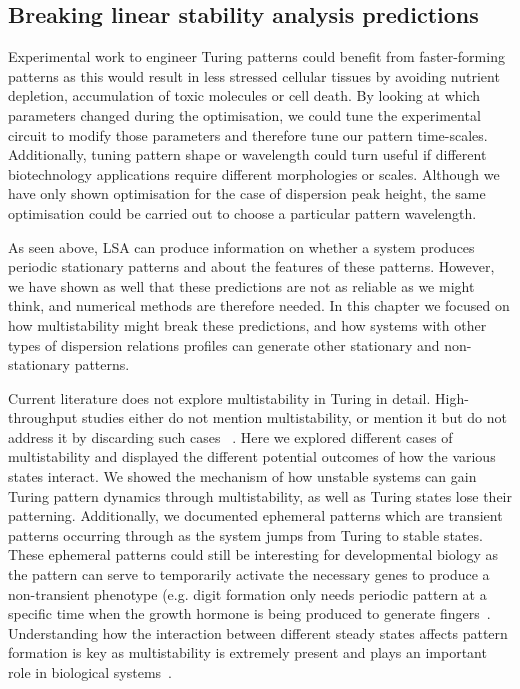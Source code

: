 \subsection*{Breaking linear stability analysis predictions}
Experimental work to engineer Turing patterns could benefit from faster-forming patterns as this would result in less stressed cellular tissues by avoiding nutrient depletion, accumulation of toxic molecules or cell death.
By looking at which parameters changed during the optimisation, we could tune the experimental circuit to modify those parameters and therefore tune our pattern time-scales.
Additionally, tuning pattern shape or wavelength could turn useful if different biotechnology applications require different morphologies or scales.
Although we have only shown optimisation for the case of dispersion peak height, the same optimisation could be carried out to choose a particular pattern wavelength.

As seen above, LSA can produce information on whether a system produces periodic stationary patterns and about the features of these patterns.
However, we have shown as well that these predictions are not as reliable as we might think, and numerical methods are therefore needed.
In this chapter we focused on how multistability might break these predictions, and how systems with other types of dispersion relations profiles can generate other stationary and non-stationary patterns.

Current literature does not explore multistability in Turing in detail.
High-throughput studies either do not mention multistability, or mention it but do not address it by discarding such cases ~\parencite{Scholes2019, Marcon, Zheng2016}.
Here we explored different cases of multistability and displayed the different potential outcomes of how the various states interact.
We showed the mechanism of how unstable systems can gain Turing pattern dynamics through multistability, as well as Turing states lose their patterning.
Additionally, we documented ephemeral patterns which are transient patterns occurring through as the system jumps from Turing to stable states.
These ephemeral patterns could still be interesting for developmental biology as the pattern can serve to temporarily activate the necessary genes to produce a non-transient phenotype (e.g. digit formation only needs periodic pattern at a specific time when the growth hormone is being produced to generate fingers~\parencite{Raspopovic1}.
Understanding how the interaction between different steady states affects pattern formation is key as multistability is extremely present and plays an important role in biological systems~\parencite{laurent1999multistability}.

